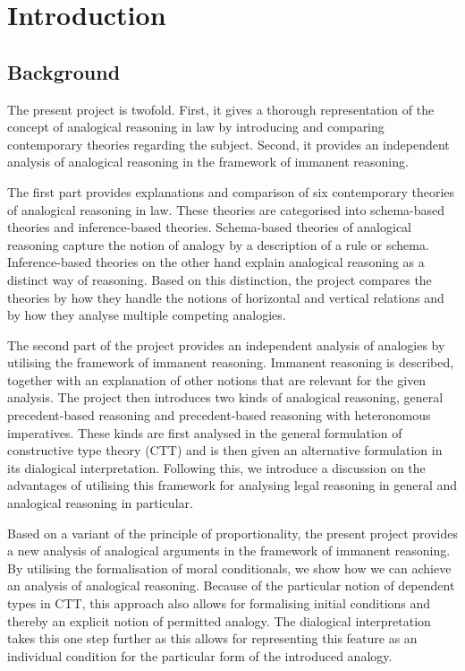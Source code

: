 \chapter{Introduction}

    \section{Background}
		The present project is twofold. First, it gives a thorough representation of the concept of analogical reasoning in law by introducing and comparing contemporary theories regarding the subject. Second, it provides an independent analysis of analogical reasoning in the framework of immanent reasoning. 
		
		The first part provides explanations and comparison of six contemporary theories of analogical reasoning in law. These theories are categorised into schema-based theories and inference-based theories. Schema-based theories of analogical reasoning capture the notion of analogy by a description of a rule or schema. Inference-based theories on the other hand explain analogical reasoning as a distinct way of reasoning. Based on this distinction, the project compares the theories by how they handle the notions of horizontal and vertical relations and by how they analyse multiple competing analogies. 
		
		The second part of the project provides an independent analysis of analogies by utilising the framework of immanent reasoning. Immanent reasoning is described, together with an explanation of other notions that are relevant for the given analysis. The project then introduces two kinds of analogical reasoning, general precedent-based reasoning and precedent-based reasoning with heteronomous imperatives. These kinds are first analysed in the general formulation of constructive type theory (CTT) and is then given an alternative formulation in its dialogical interpretation. Following this, we introduce a discussion on the advantages of utilising this framework for analysing legal reasoning in general and analogical reasoning in particular.
		
		Based on a variant of the principle of proportionality, the present project provides a new analysis of analogical arguments in the framework of immanent reasoning. By utilising the formalisation of moral conditionals, we show how we can achieve an analysis of analogical reasoning. Because of the particular notion of dependent types in CTT, this approach also allows for formalising initial conditions and thereby an explicit notion of permitted analogy. The dialogical interpretation takes this one step further as this allows for representing this feature as an individual condition for the particular form of the introduced analogy.
		
